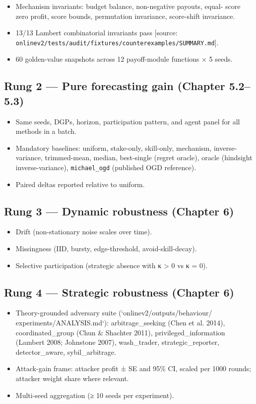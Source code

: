 \documentclass[11pt,a4paper,openany]{report}
\begin{document}
\begin{itemize}
  \item Mechanism invariants: budget balance, non-negative payouts, equal-
    score zero profit, score bounds, permutation invariance, score-shift
    invariance.
  \item 13/13 Lambert combinatorial invariants pass
    [source: \texttt{onlinev2/tests/audit/fixtures/counterexamples/SUMMARY.md}].
  \item 60 golden-value snapshots across 12 payoff-module functions × 5
    seeds.
\end{itemize}

\subsection{Rung 2 — Pure forecasting gain (Chapter 5.2–5.3)}

\begin{itemize}
  \item Same seeds, DGPs, horizon, participation pattern, and agent panel for
    all methods in a batch.
  \item Mandatory baselines: uniform, stake-only, skill-only, mechanism,
    inverse-variance, trimmed-mean, median, best-single (regret oracle),
    oracle (hindsight inverse-variance), \texttt{michael\_ogd} (published OGD
    reference).
  \item Paired deltas reported relative to uniform.
\end{itemize}

\subsection{Rung 3 — Dynamic robustness (Chapter 6)}

\begin{itemize}
  \item Drift (non-stationary noise scales over time).
  \item Missingness (IID, bursty, edge-threshold, avoid-skill-decay).
  \item Selective participation (strategic absence with κ > 0 vs κ = 0).
\end{itemize}

\subsection{Rung 4 — Strategic robustness (Chapter 6)}

\begin{itemize}
  \item Theory-grounded adversary suite (`onlinev2/outputs/behaviour/
    experiments/ANALYSIS.md`): arbitrage\_seeking (Chen et al. 2014),
    coordinated\_group (Chun \& Shachter 2011), privileged\_information
    (Lambert 2008; Johnstone 2007), wash\_trader, strategic\_reporter,
    detector\_aware, sybil\_arbitrage.
  \item Attack-gain frame: attacker profit ± SE and 95\% CI, scaled per
    1000 rounds; attacker weight share where relevant.
  \item Multi-seed aggregation (≥ 10 seeds per experiment).
\end{itemize}
\end{document}
